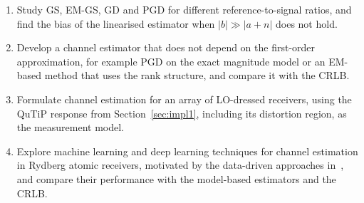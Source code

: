 \documentclass[11pt,a4paper]{article}
\begin{document}
\begin{enumerate}[leftmargin=*,itemsep=2pt]
  \item Study GS, EM-GS, GD and PGD for different reference-to-signal ratios, and find the bias
        of the linearised estimator when $|b|\gg|a+n|$ does not hold.
  \item Develop a channel estimator that does not depend on the first-order approximation, for
        example PGD on the exact magnitude model or an EM-based method that uses the rank
        structure, and compare it with the CRLB.
  \item Formulate channel estimation for an array of LO-dressed receivers, using the QuTiP
        response from Section~\ref{sec:impl1}, including its distortion region, as the
        measurement model.
  \item Explore machine learning and deep learning techniques for channel estimation in Rydberg
        atomic receivers, motivated by the data-driven approaches in~\cite{cui2026rare,liu2022deep},
        and compare their performance with the model-based estimators and the CRLB.
\end{enumerate}
\end{document}
